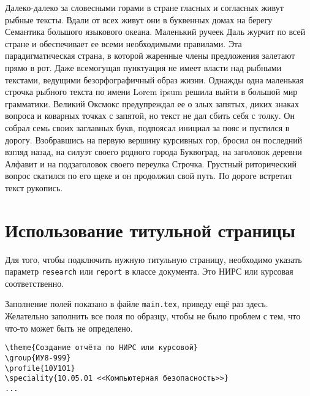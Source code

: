 Далеко-далеко за словесными горами в стране гласных и согласных живут рыбные тексты. Вдали от всех живут они в буквенных домах на берегу Семантика большого языкового океана. Маленький ручеек Даль журчит по всей стране и обеспечивает ее всеми необходимыми правилами. Эта парадигматическая страна, в которой жаренные члены предложения залетают прямо в рот. Даже всемогущая пунктуация не имеет власти над рыбными текстами, ведущими безорфографичный образ жизни. Однажды одна маленькая строчка рыбного текста по имени Lorem ipsum решила выйти в большой мир грамматики. Великий Оксмокс предупреждал ее о злых запятых, диких знаках вопроса и коварных точках с запятой, но текст не дал сбить себя с толку. Он собрал семь своих заглавных букв, подпоясал инициал за пояс и пустился в дорогу. Взобравшись на первую вершину курсивных гор, бросил он последний взгляд назад, на силуэт своего родного города Буквоград, на заголовок деревни Алфавит и на подзаголовок своего переулка Строчка. Грустный риторический вопрос скатился по его щеке и он продолжил свой путь. По дороге встретил текст рукопись.

\section{Использование титульной страницы}

Для того, чтобы подключить нужную титульную страницу, необходимо указать параметр 
\texttt{research} или \texttt{report} в классе документа. Это НИРС или курсовая 
соответственно. 

Заполнение полей показано в файле \texttt{main.tex}, приведу ещё раз здесь. Желательно заполнить все поля по образцу, чтобы не было проблем с тем, что что-то может быть не определено.

\begin{verbatim}
\theme{Создание отчёта по НИРС или курсовой}
\group{ИУ8-999}
\profile{10У101}
\speciality{10.05.01 <<Компьютерная безопасность>>}
...
\end{verbatim}